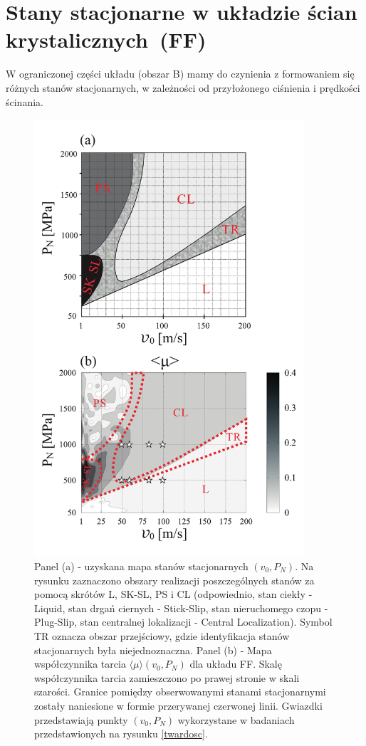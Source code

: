 \documentclass[12pt,a4paper,openright]{report} %
\begin{document}
\section{Stany stacjonarne w układzie ścian krystalicznych~(FF)}
%
W ograniczonej części układu (obszar B) mamy do czynienia z formowaniem się różnych stanów stacjonarnych, w zależności od przyłożonego ciśnienia i prędkości ścinania.
\begin{figure}
\centering
\includegraphics[width=100mm]{rysunki/PRE16_fig7_8.pdf}
\caption{Panel (a) - uzyskana mapa stanów stacjonarnych $(v_0, P_N)$. Na rysunku zaznaczono obszary realizacji poszczególnych stanów za pomocą skrótów L, SK-SL, PS i CL (odpowiednio, stan ciekły - Liquid, stan drgań ciernych - Stick-Slip, stan nieruchomego czopu - Plug-Slip, stan centralnej lokalizacji - Central Localization). Symbol TR oznacza obszar przejściowy, gdzie identyfikacja stanów stacjonarnych była niejednoznaczna. Panel (b) - Mapa współczynnika tarcia $\langle \mu \rangle(v_0, P_N)$ dla układu FF. Skalę współczynnika tarcia zamieszczono po prawej stronie w skali szarości. Granice pomiędzy obserwowanymi stanami stacjonarnymi zostały naniesione w formie przerywanej czerwonej linii. Gwiazdki przedstawiają punkty $(v_0, P_N)$ wykorzystane w badaniach przedstawionych na rysunku \ref{twardosc}.}
\label{mapa_stanow}
\end{figure} 
\end{document}
